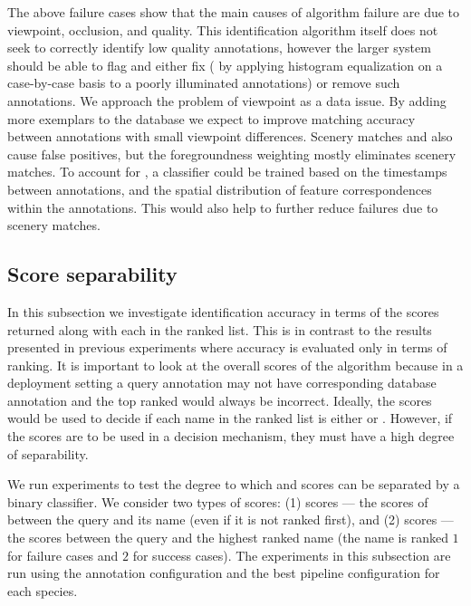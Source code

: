 \begin{itemln}
              \FailPhotobomb{}
        \end{itemln}


        The above failure cases show that the main causes of algorithm failure are due to viewpoint, occlusion,
          and quality.
        This identification algorithm itself does not seek to correctly identify low quality annotations, however
          the larger system should be able to flag and either fix (\eg{} by applying histogram equalization on a
          case-by-case basis to a poorly illuminated annotations) or remove such annotations.
        We approach the problem of viewpoint as a data issue.
        By adding more exemplars to the database we expect to improve matching accuracy between annotations with
          small viewpoint differences.
        Scenery matches and \photobombings{} also cause false positives, but the foregroundness weighting mostly
          eliminates scenery matches.
        To account for \photobombings{}, a classifier could be trained based on the timestamps between
          annotations, and the spatial distribution of feature correspondences within the annotations.
        This would also help to further reduce failures due to scenery matches.
        
    \subsection{Score separability}\label{sub:exptsep}  
        In this subsection we investigate identification accuracy in terms of the scores returned along with each
          \name{} in the ranked list.
        This is in contrast to the results presented in previous experiments where accuracy is evaluated only in
          terms of ranking.
        It is important to look at the overall scores of the algorithm because in a deployment setting a query
          annotation may not have corresponding \groundtrue{} database annotation and the top ranked \name{} would
          always be incorrect.
        Ideally, the scores would be used to decide if each name in the ranked list is either \groundtrue{} or
          \groundfalse{}.
        However, if the scores are to be used in a decision mechanism, they must have a high degree of
          separability.

        We run experiments to test the degree to which \groundtrue{} and \groundfalse{} scores can be separated
          by a binary classifier.
        We consider two types of scores:
        (1) \groundtrue{} scores --- the scores of between the query and its \groundtrue{} name (even if it is
          not ranked first), and
        (2) \groundfalse{} scores --- the scores between the query and the highest ranked \groundfalse{} name
          (the \groundfalse{} name is ranked $1$\st{} for failure cases and $2$\nd{} for success cases).
        The experiments in this subsection are run using the \timectrl{} annotation configuration and the best
          pipeline configuration for each species.
           
